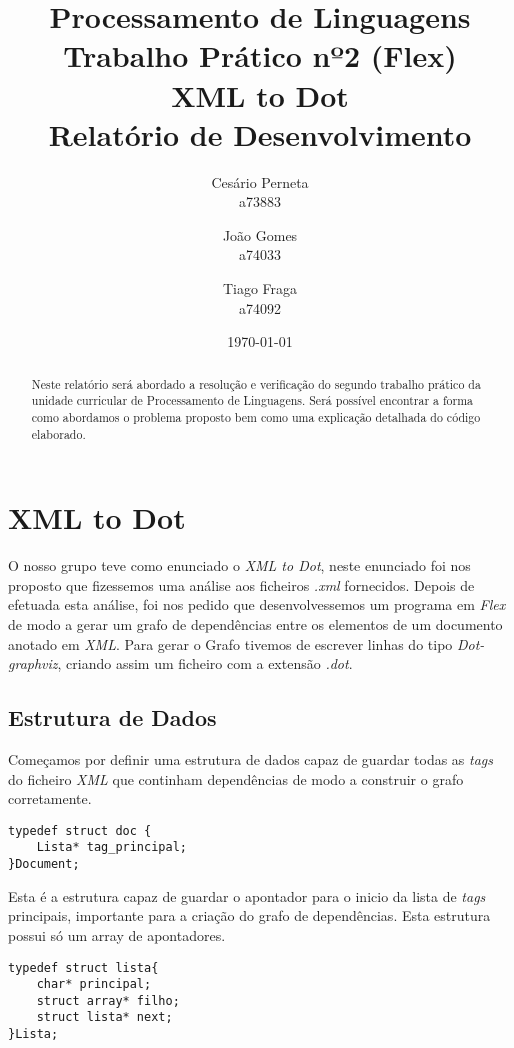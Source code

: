 \documentclass{report}
\title{Processamento de Linguagens\\ \textbf{Trabalho Prático nº2 (Flex)}\\ \textbf{XML to Dot} \\Relatório de Desenvolvimento}
\author{Cesário Perneta\\ a73883 \and João Gomes\\ a74033 \and Tiago Fraga\\ a74092}
\date{\today}
\def\titulo#1{\section{#1}}
\begin{document}

\maketitle

\begin{abstract}
    Neste relatório será abordado a resolução e verificação do segundo trabalho prático da unidade curricular de Processamento de Linguagens. Será possível encontrar a forma como abordamos o problema proposto bem como uma explicação detalhada do código elaborado.
\end{abstract}

\tableofcontents

\chapter{ XML to Dot} \label{intro}
    
    O nosso grupo teve como enunciado o \textit{XML to Dot}, neste enunciado foi nos proposto que fizessemos uma análise aos ficheiros \textit{.xml} fornecidos. 
    Depois de efetuada esta análise, foi nos pedido que desenvolvessemos um programa em \textit{Flex} de modo a gerar um grafo de dependências entre os elementos de um documento anotado em \textit{XML}.
    Para gerar o Grafo tivemos de escrever linhas do tipo \textit{Dot-graphviz}, criando assim um ficheiro com  a extensão \textit{.dot}.         

\titulo{ Estrutura de Dados }

    Começamos por definir uma estrutura de dados capaz de guardar todas as \textit{tags} do ficheiro \textit{XML} que continham dependências de modo a construir o grafo corretamente.

\bigskip

\begin{verbatim}
typedef struct doc {
    Lista* tag_principal;       
}Document;
\end{verbatim}

    Esta é a estrutura capaz de guardar o apontador para o inicio da lista de \textit{tags} principais, importante para a criação do grafo de dependências. Esta estrutura possui só um array de apontadores.  
 

\begin{verbatim}
typedef struct lista{
    char* principal;
    struct array* filho;
    struct lista* next;
}Lista;
\end{verbatim}
\end{document}
